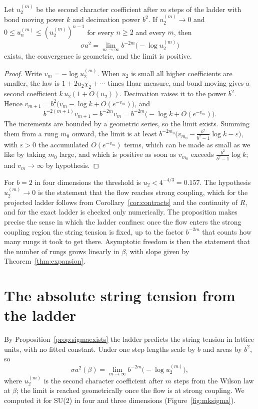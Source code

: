 \begin{proposition}\label{prop:sigmaexists}
Let $u^{(m)}_2$ be the second character coefficient after $m$ steps of the ladder with bond moving power $k$ and decimation power $b^2$. If $u_2^{(m)}\to0$ and $0\le u_n^{(m)}\le(u_2^{(m)})^{n-1}$ for every $n\ge2$ and every $m$, then
\[
\sigma a^2=\lim_{m\to\infty}b^{-2m}\big(-\log u_2^{(m)}\big)
\]
exists, the convergence is geometric, and the limit is positive.
\end{proposition}

\begin{proof}
Write $v_m=-\log u_2^{(m)}$. When $u_2$ is small all higher coefficients are smaller, the law is $1+2u_2\chi_2+\cdots$ times Haar measure, and bond moving gives a second coefficient $k\,u_2(1+O(u_2))$. Decimation raises it to the power $b^2$. Hence $v_{m+1}=b^2\big(v_m-\log k+O(e^{-v_m})\big)$, and
\[
b^{-2(m+1)}v_{m+1}-b^{-2m}v_m=b^{-2m}\big(-\log k+O(e^{-v_m})\big).
\]
The increments are bounded by a geometric series, so the limit exists. Summing them from a rung $m_0$ onward, the limit is at least $b^{-2m_0}\big(v_{m_0}-\frac{b^2}{b^2-1}\log k-\varepsilon\big)$, with $\varepsilon>0$ the accumulated $O(e^{-v_m})$ terms, which can be made as small as we like by taking $m_0$ large, and which is positive as soon as $v_{m_0}$ exceeds $\frac{b^2}{b^2-1}\log k$; and $v_m\to\infty$ by hypothesis.
\end{proof}

For $b=2$ in four dimensions the threshold is $u_2<4^{-4/3}=0.157$. The hypothesis $u_2^{(m)}\to0$ is the statement that the flow reaches strong coupling, which for the projected ladder follows from Corollary~\ref{cor:contracts} and the continuity of $R$, and for the exact ladder is checked only numerically. The proposition makes precise the sense in which the ladder confines: once the flow enters the strong coupling region the string tension is fixed, up to the factor $b^{-2m}$ that counts how many rungs it took to get there. Asymptotic freedom is then the statement that the number of rungs grows linearly in $\beta$, with slope given by Theorem~\ref{thm:expansion}.

\section{The absolute string tension from the ladder}

By Proposition~\ref{prop:sigmaexists} the ladder predicts the string tension in lattice units, with no fitted constant. Under one step lengths scale by $b$ and areas by $b^2$, so
\[
\sigma a^2(\beta)=\lim_{m\to\infty}b^{-2m}\big(-\log u_2^{(m)}\big),
\]
where $u_2^{(m)}$ is the second character coefficient after $m$ steps from the Wilson law at $\beta$; the limit is reached geometrically once the flow is at strong coupling. We computed it for SU(2) in four and three dimensions (Figure~\ref{fig:mksigma}).

